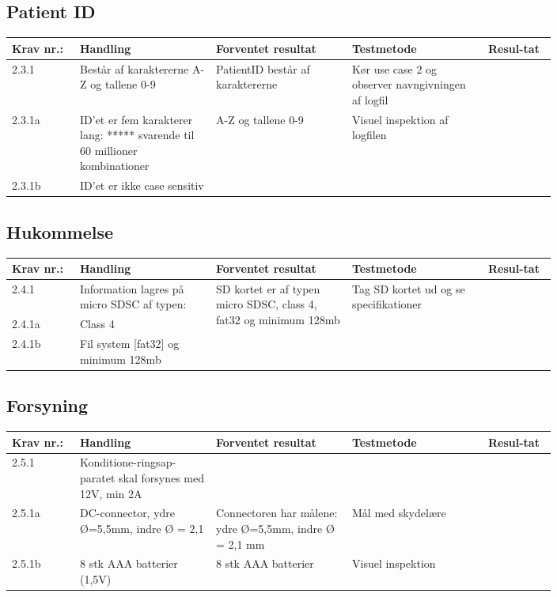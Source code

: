 \documentclass[12pt, a4paper]{memoir}
\begin{document}
\begin{landscape}
			\pagebreak
			\subsection{Patient ID}
				\begin{longtable}{|p{0.1\linewidth}|p{0.2\linewidth}|p{0.2\linewidth}|p{0.2\linewidth}|p{0.1\linewidth}|}
					\hline
					Krav nr.: & Handling & Forventet resultat & Testmetode & Resul-tat  \\\hline
					2.3.1 & Består af karaktererne A-Z og tallene 0-9 & PatientID består af karaktererne  & Kør use case 2  og observer navngivningen af logfil & \\ \hline
					2.3.1a& ID’et er fem karakterer lang: ***** svarende til 60 millioner kombinationer & \multirow{2}{0.2\linewidth}{A-Z og tallene 0-9} & \multirow{2}{0.2\linewidth}{Visuel inspektion af logfilen}  & \multirow{2}{0.2\linewidth}{} \\ \cline{1-2}
					2.3.1b& ID’et er ikke case sensitiv  & &  & \\ \hline
				\end{longtable}
			
			\subsection{Hukommelse}
				\begin{longtable}{|p{0.1\linewidth}|p{0.2\linewidth}|p{0.2\linewidth}|p{0.2\linewidth}|p{0.1\linewidth}|}
					\hline
					Krav nr.: & Handling & Forventet resultat & Testmetode & Resul-tat  \\\hline
					2.4.1& Information lagres på micro SDSC af typen: & \multirow{3}{\linewidth}{SD kortet er af typen micro SDSC, class 4, fat32 og minimum 128mb} & \multirow{3}{\linewidth}{Tag SD kortet ud og se specifikationer}  & \multirow{3}{\linewidth}{}  \\ \cline{1-2}
					2.4.1a& Class 4 & &  & \\ \cline{1-2}
					2.4.1b& Fil system [fat32] og minimum 128mb  & &  & \\ \hline
				\end{longtable}
			
			\pagebreak
			\subsection{Forsyning}
				\begin{longtable}{|p{0.1\linewidth}|p{0.2\linewidth}|p{0.2\linewidth}|p{0.2\linewidth}|p{0.1\linewidth}|}
					\hline
					Krav nr.: & Handling & Forventet resultat & Testmetode & Resul-tat  \\\hline
					2.5.1& Konditione-ringsap-paratet skal forsynes med 12V, min 2A & &  & \\ \hline
					2.5.1a& DC-connector, ydre Ø=5,5mm, indre Ø = 2,1  & Connectoren har målene: ydre Ø=5,5mm, indre Ø = 2,1 mm & Mål med skydelære  & \\ \hline
					2.5.1b& 8 stk AAA batterier (1,5V)  & 8 stk AAA batterier & Visuel inspektion  & \\ \hline
				\end{longtable}
			

\end{landscape}
\end{document}
